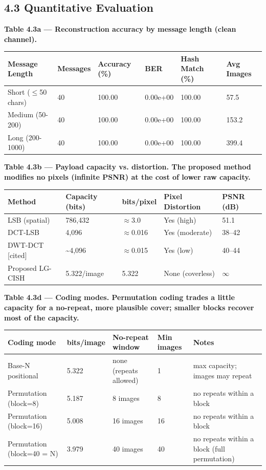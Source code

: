 \documentclass[11pt]{article}
\begin{document}
\subsection*{4.3 Quantitative Evaluation}
\textbf{Table 4.3a --- Reconstruction accuracy by message length (clean channel).}
\begin{table}[H]\centering\small
\begin{tabularx}{\textwidth}{lXXXXX}
\toprule
Message Length & Messages & Accuracy (\%) & BER & Hash Match (\%) & Avg Images \\
\midrule
Short ($\le$50 chars) & 40 & 100.00 & 0.00e+00 & 100.00 & 57.5 \\
Medium (50-200) & 40 & 100.00 & 0.00e+00 & 100.00 & 153.2 \\
Long (200-1000) & 40 & 100.00 & 0.00e+00 & 100.00 & 399.4 \\
\bottomrule
\end{tabularx}
\end{table}
\textbf{Table 4.3b --- Payload capacity vs. distortion. The proposed method modifies no pixels (infinite PSNR) at the cost of lower raw capacity.}
\begin{table}[H]\centering\small
\begin{tabularx}{\textwidth}{lXXXX}
\toprule
Method & Capacity (bits) & bits/pixel & Pixel Distortion & PSNR (dB) \\
\midrule
LSB (spatial) & 786,432 & $\approx$3.0 & Yes (high) & 51.1 \\
DCT-LSB & 4,096 & $\approx$0.016 & Yes (moderate) & 38--42 \\
DWT-DCT [cited] & \textasciitilde{}4,096 & $\approx$0.015 & Yes (low) & 40--44 \\
Proposed LG-CISH & 5.322/image & 5.322 & None (coverless) & $\infty$ \\
\bottomrule
\end{tabularx}
\end{table}
\textbf{Table 4.3d --- Coding modes. Permutation coding trades a little capacity for a no-repeat, more plausible cover; smaller blocks recover most of the capacity.}
\begin{table}[H]\centering\small
\begin{tabularx}{\textwidth}{lXXXX}
\toprule
Coding mode & bits/image & No-repeat window & Min images & Notes \\
\midrule
Base-N positional & 5.322 & none (repeats allowed) & 1 & max capacity; images may repeat \\
Permutation (block=8) & 5.187 & 8 images & 8 & no repeats within a block \\
Permutation (block=16) & 5.008 & 16 images & 16 & no repeats within a block \\
Permutation (block=40 = N) & 3.979 & 40 images & 40 & no repeats within a block (full permutation) \\
\bottomrule
\end{tabularx}
\end{table}
\end{document}
